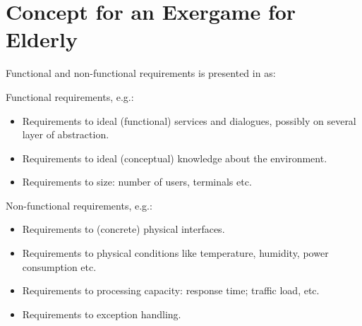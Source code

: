 \chapter{Concept for an Exergame for Elderly}

Functional and non-functional requirements is presented in \cite{systemutviklingDel1} as:

Functional requirements, e.g.:
\begin{itemize}
\item Requirements to ideal (functional) services and dialogues, possibly on several layer of abstraction.
\item Requirements to ideal (conceptual) knowledge about the environment.	
\item Requirements to size: number of users, terminals etc.
\end{itemize}

Non-functional requirements, e.g.:
\begin{itemize}
\item Requirements to (concrete) physical interfaces.
\item Requirements to physical conditions like temperature, humidity, power consumption etc.
\item Requirements to processing capacity: response time; traffic load, etc.
\item Requirements to exception handling.
\end{itemize}